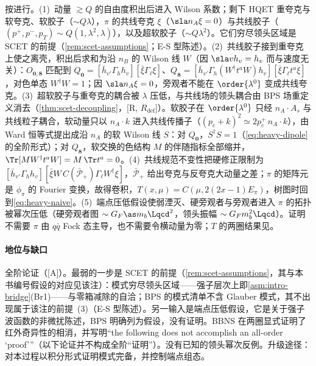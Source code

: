 \begin{proofsketch}
按\cite{BauerPirjolStewart2001}进行。(1)~动量 $\gtrsim Q$ 的自由度积出后进入 Wilson 系数；剩下 HQET 重夸克与软夸克、软胶子（$\sim Q\lambda$），$\pi$ 的共线夸克 $\xi$（$\sla n_A\xi=0$）与共线胶子（$(p^+,p^-,p_T)\sim Q(1,\lambda^2,\lambda)$），以及超软胶子（$\sim Q\lambda^2$）。它们穷尽领头区域是 SCET 的前提（\cref{rem:scet-assumptions}；E-S 型陈述）。(2)~共线胶子接到重夸克上使之离壳，积出后求和为沿 $n_B$ 的 Wilson 线 $W$（因 $\sla vh_v=h_v$ 而与速度无关）：$O_{\mathbf 0,\mathbf 8}$ 匹配到 $Q_{\mathbf 0}=[\bar h_{v'}\Gamma_hh_v][\bar\xi\Gamma_\ell\xi]$、$Q_{\mathbf 8}=[\bar h_{v'}\Gamma_h(W^\dagger t^aW)h_v][\bar\xi\Gamma_\ell t^a\xi]$，对色单态 $W^\dagger W=1$；因 $\sla n_A\xi=0$，旁观者不能在 $\order{\lambda^0}$ 变成共线夸克。(3)~超软胶子与重夸克的耦合被 $\lambda$ 压低，与共线场的领头耦合由 BPS 场重定义消去（\cref{thm:scet-decoupling}，[R, $R_{\mathrm{def}}$]）。软胶子在 $\order{\lambda^0}$ 只经 $n_A\cdot A_s$ 与共线粒子耦合，软动量只以 $n_A\cdot k$ 进入共线传播子（$(p_c+k)^2\simeq2p_c^+\,n_A\cdot k$），由 Ward 恒等式提出成沿 $n_A$ 的软 Wilson 线 $S$：对 $Q_{\mathbf 0}$，$S^\dagger S=1$（\cref{eq:heavy-dipole}的全阶形式）；对 $Q_{\mathbf 8}$，软交换的色结构 $M$ 的伴随指标全部缩并，$\Tr[MW^\dagger t^aW]=M\,\Tr t^a=0$\cite[式~(7)]{BauerPirjolStewart2001}。(4)~共线规范不变性把硬修正限制为 $[\bar h_{v'}\Gamma_hh_v][\bar\xi W\,C(\bar{\mathcal P}_+)\Gamma_\ell W^\dagger\xi]$，$\bar{\mathcal P}_+$ 给出夸克与反夸克大动量之差；$\pi$ 的矩阵元是 $\phi_\pi$ 的 Fourier 变换，故得卷积，$T(x,\mu)=C(\mu,2(2x-1)E_\pi)$，树图时回到\cref{eq:heavy-naive}。(5)~端点压低假设使弱湮灭、硬旁观者与旁观者进入 $\pi$ 的拓扑被幂次压低（硬旁观者图 $\sim G_F\as m_b\Lqcd^2$，领头振幅 $\sim G_Fm_b^2\Lqcd$\cite[式~(26)、(28)]{BenekeEtAl2000}）。证明不需要 $\pi$ 由 $q\bar q$ Fock 态主导，也不需要令横动量为零；$T$ 的两圈结果见\cite{Huber:2016xod}。
\end{proofsketch}

\paragraph{地位与缺口}
全阶论证（[A]）。最弱的一步是 SCET 的前提（\cref{rem:scet-assumptions}，其与本书编号假设的对应见该注）：模式穷尽领头区域——强子层次上即\cref{asm:intro-bridge}(Br1)——与零箱减除的自洽；BPS 的模式清单不含 Glauber 模式，其不出现属于该注的前提~(3)（E-S 型陈述）。另一输入是端点压低假设，它是关于强子波函数的非微扰陈述，BPS 明确列为假设，没有证明。BBNS 在两圈显式证明了红外奇异性的相消，并写明“the following does not accomplish an all-order ‘proof’”（以下论证并不构成全阶“证明”）\cite[第~5~节]{BenekeEtAl2000}。没有已知的领头幂次反例。升级途径：对本过程以积分形式证明模式完备，并控制端点组态。
